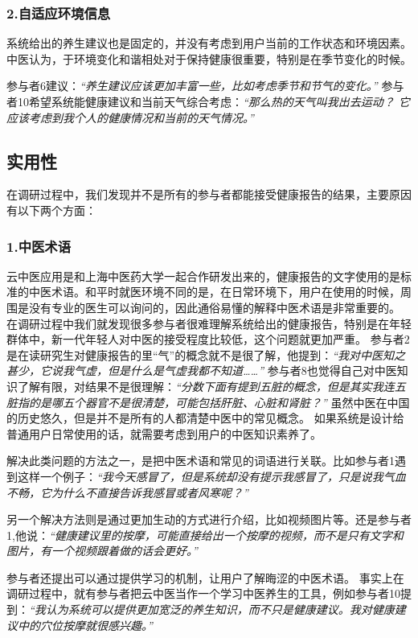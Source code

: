\subsubsection{2.自适应环境信息}

系统给出的养生建议也是固定的，并没有考虑到用户当前的工作状态和环境因素。中医认为，于环境变化和谐相处对于保持健康很重要，特别是在季节变化的时候。

参与者6建议：\textit{“养生建议应该更加丰富一些，比如考虑季节和节气的变化。”} 
参与者10希望系统能健康建议和当前天气综合考虑：\textit{“那么热的天气叫我出去运动？ 它应该考虑到我个人的健康情况和当前的天气情况。”}

\subsection{实用性}
在调研过程中，我们发现并不是所有的参与者都能接受健康报告的结果，主要原因有以下两个方面：

\subsubsection{1.中医术语}

云中医应用是和上海中医药大学一起合作研发出来的，健康报告的文字使用的是标准的中医术语。和平时就医环境不同的是，在日常环境下，用户在使用的时候，周围是没有专业的医生可以询问的，因此通俗易懂的解释中医术语是非常重要的。
在调研过程中我们就发现很多参与者很难理解系统给出的健康报告，特别是在年轻群体中，新一代年轻人对中医的接受程度比较低，这个问题就更加严重。
参与者2是在读研究生对健康报告的里“气”的概念就不是很了解，他提到：\textit{“我对中医知之甚少，它说我气虚，但是什么是气虚我都不知道……”}
参与者8也觉得自己对中医知识了解有限，对结果不是很理解：\textit{“分数下面有提到五脏的概念，但是其实我连五脏指的是哪五个器官不是很清楚，可能包括肝脏、心脏和肾脏？”}
虽然中医在中国的历史悠久，但是并不是所有的人都清楚中医中的常见概念。 如果系统是设计给普通用户日常使用的话，就需要考虑到用户的中医知识素养了。

解决此类问题的方法之一，是把中医术语和常见的词语进行关联。比如参与者1遇到这样一个例子：\textit{“我今天感冒了，但是系统却没有提示我感冒了，只是说我气血不畅，它为什么不直接告诉我感冒或者风寒呢？”}

另一个解决方法则是通过更加生动的方式进行介绍，比如视频图片等。还是参与者1,他说：\textit{“健康建议里的按摩，可能直接给出一个按摩的视频，而不是只有文字和图片，有一个视频跟着做的话会更好。”}

参与者还提出可以通过提供学习的机制，让用户了解晦涩的中医术语。
事实上在调研过程中，就有参与者把云中医当作一个学习中医养生的工具，例如参与者10提到：\textit{“我认为系统可以提供更加宽泛的养生知识，而不只是健康建议。我对健康建议中的穴位按摩就很感兴趣。”}

